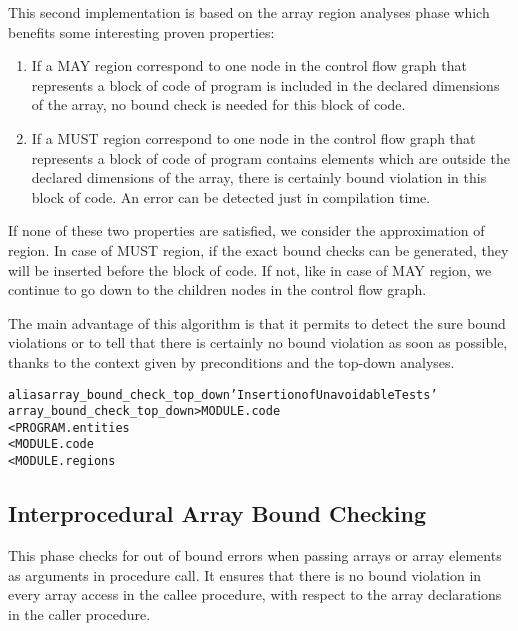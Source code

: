 \documentclass[a4paper]{report}
\newenvironment{PipsMake}{\begin{alltt}}{\end{alltt}}
\begin{document}
This second implementation is based on the array region analyses phase which benefits some interesting proven properties:

\begin{enumerate}

\item If a MAY region correspond to one node in the control flow graph
  that represents a block of code of program is included in the
  declared dimensions of the array, no bound check is needed for this
  block of code.

\item If a MUST region correspond to one node in the control
  flow graph that represents a block of code of program contains elements
  which are outside the declared dimensions of the  array, there is
  certainly bound violation in this block of code. An error can be
  detected just in compilation time.

\end{enumerate}

If none of these two properties are satisfied, we consider the
approximation of region. In case of MUST region, if the exact bound checks
can be generated, they will be inserted before the block of code. If not, like in
case of MAY region, we continue to go down to the children nodes in the
control flow graph.   

 The main advantage
of this algorithm is that it permits to detect the sure bound violations
or to tell that there is certainly no bound violation as soon as
possible, thanks to the context given by preconditions and the top-down
analyses.

\begin{PipsMake}
alias array_bound_check_top_down 'Insertion of Unavoidable Tests'
array_bound_check_top_down   > MODULE.code
        < PROGRAM.entities
        < MODULE.code
        < MODULE.regions
\end{PipsMake}

\subsection{Interprocedural Array Bound Checking}
\label{subsection-array-bound-check_interprocedural}

This phase checks for out of bound errors when passing arrays or array
elements as arguments in procedure call. It ensures that there is no bound
violation in every array access in the callee procedure, with respect to
the array declarations in the caller procedure.
\end{document}
